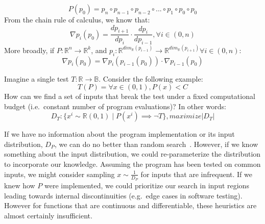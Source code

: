 \documentclass[12pt,initial,twoside,maitrise]{dms}
\numberwithin{equation}{section}
\numberwithin{table}{chapter}
\numberwithin{figure}{chapter}
\begin{document}
%
\begin{equation}
    P(p_0)=p_n \circ p_{n-1} \circ p_{n-2} \circ ... \circ p_1 \circ p_0 \circ p_0
\end{equation}
%
From the chain rule of calculus, we know that:
%
\begin{equation}
    \nabla p_i(p_0) = \frac{dp_{i+1}}{dp_{i}} \cdot \frac{dp_{i}}{dp_{i-1}}, \forall i \in (0, n)
\end{equation}
%
More broadly, if $P: \mathbb{R}^n\rightarrow\mathbb{R}^k$, and $p_{i}: \mathbb{R}^{dim_{\mathbb{R}}(p_{i-1})}\rightarrow \mathbb{R}^{dim_{\mathbb{R}}(p_{i+1})} \forall i \in (0, n)$:
%
\begin{equation}
    \nabla p_i(p_0) = \nabla p_i(p_{i-1}(p_0)) \cdot \nabla p_{i-1}(p_0)
\end{equation}

%
%
Imagine a single test $T: \mathbb{R} \rightarrow \mathbb{B}$. Consider the following example:
%
\begin{equation}
    T(P) = \forall x \in (0, 1), P(x) < C
\end{equation}
%
How can we find a set of inputs that break the test under a fixed computational budget (i.e.\ constant number of program evaluations)? In other words:
%
\begin{equation}
    D_T: \{ x^i \sim \mathbb{R}(0, 1) \mid P(x^i) \implies \neg T \}, maximize |D_T|
\end{equation}
%

If we have no information about the program implementation or its input distribution, $D_P$, we can do no better than random search~\citep{wolpert1997no}. However, if we know something about the input distribution, we could re-parameterize the distribution to incorporate our knowledge. Assuming the program has been tested on common inputs, we might consider sampling $x \sim \frac{1}{D_P}$ for inputs that are infrequent. If we knew how $P$ were implemented, we could prioritize our search in input regions leading towards internal discontinuities (e.g.\ edge cases in software testing). However for functions that are continuous and differentiable, these heuristics are almost certainly insufficient.

\end{document}
